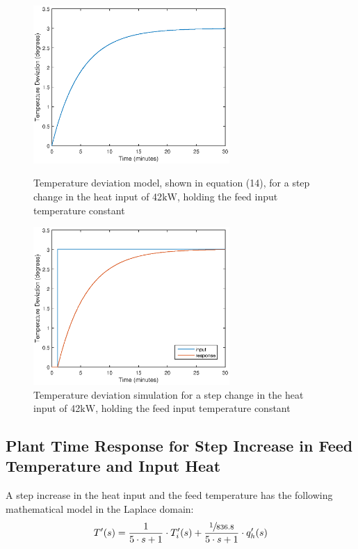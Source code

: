 \documentclass{article}
\begin{document}
\begin{figure}[h]
\begin{minipage}{0.45\textwidth}
\centering
\includegraphics[height=6cm]{1b_mod}
\caption{Temperature deviation model, shown in equation (14), for a step change in the heat input of 42$\si{\kilo\watt}$, holding the feed input temperature constant}
\end{minipage}
\hspace{1cm}
\begin{minipage}{0.45\textwidth}
\centering
\includegraphics[height=6cm]{1b_sim}
\caption{Temperature deviation simulation for a step change in the heat input of 42$\si{\kilo\watt}$, holding the feed input temperature constant}
\end{minipage}
\end{figure}

\subsection{Plant Time Response for Step Increase in Feed Temperature and Input Heat}

A step increase in the heat input and the feed temperature has the following mathematical model in the Laplace domain:
\begin{align}
T'(s) = \frac{1}{5 \cdot s + 1} \cdot T'_i(s) + \frac{\sfrac{1}{836.8}}{5 \cdot s + 1} \cdot q'_h(s)
\end{align} 
\end{document}
